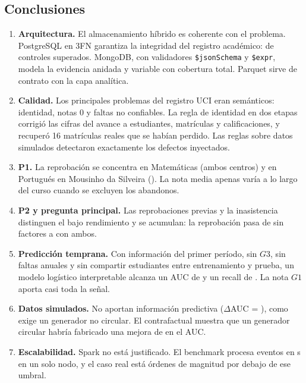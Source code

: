 \documentclass[11pt,a4paper]{article}
\begin{document}
\subsection{Conclusiones}
\begin{enumerate}
\item \textbf{Arquitectura.} El almacenamiento híbrido es coherente con el problema. PostgreSQL en 3FN
garantiza la integridad del registro académico: \nControlesOk{} de \nControlesSql{} controles
superados. MongoDB, con validadores \texttt{\$jsonSchema} y \texttt{\$expr}, modela la evidencia
anidada y variable con cobertura total. Parquet sirve de contrato con la capa analítica.
\item \textbf{Calidad.} Los principales problemas del registro UCI eran semánticos: identidad, notas 0
y faltas no confiables. La regla de identidad en dos etapas corrigió las cifras del avance a
\nEst{} estudiantes, \nMat{} matrículas y \nCal{} calificaciones, y recuperó 16 matrículas reales
que se habían perdido. Las reglas sobre datos simulados detectaron exactamente los defectos
inyectados.
\item \textbf{P1.} La reprobación se concentra en Matemáticas (ambos centros) y en Portugués en
Mousinho da Silveira (\tasaPorMs{}). La nota media apenas varía a lo largo del curso cuando se
excluyen los abandonos.
\item \textbf{P2 y pregunta principal.} Las reprobaciones previas y la inasistencia distinguen el bajo
rendimiento y se acumulan: la reprobación pasa de \gradCero{} sin factores a \gradDos{} con ambos.
\item \textbf{Predicción temprana.} Con información del primer período, sin $G3$, sin faltas anuales y
sin compartir estudiantes entre entrenamiento y prueba, un modelo logístico interpretable alcanza un
AUC de \aucALr{} y un recall de \recALr{}. La nota $G1$ aporta casi toda la señal.
\item \textbf{Datos simulados.} No aportan información predictiva ($\Delta$AUC = \dAsimALr{}), como
exige un generador no circular. El contrafactual muestra que un generador circular habría fabricado
una mejora de \circDifC{} en el AUC.
\item \textbf{Escalabilidad.} Spark no está justificado. El benchmark procesa \benchMaxFilas{} eventos
en \benchMaxT{} s en un solo nodo, y el caso real está \benchOrdenes{} órdenes de magnitud por debajo de ese umbral.
\end{enumerate}
\end{document}
